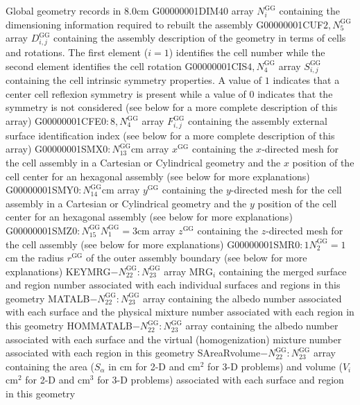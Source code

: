\begin{DescriptionEnregistrement}{Global geometry records in }{8.0cm}\label{tabl:NXTRecords}
\IntEnr
  {G00000001DIM}{$40$}
  {array $N^{\text{GG}}_{i}$ containing the dimensioning information required to rebuilt the assembly} 
\IntEnr
  {G00000001CUF}{$2,N^{\text{GG}}_{5}$}
  {array $D^{\text{GG}}_{i,j}$ containing the assembly description of the geometry in terms of cells and rotations. The first element ($i=1$) identifies the cell number while the second element identifies the cell rotation} 
\IntEnr
  {G00000001CIS}{$4,N^{\text{GG}}_{4}$}
  {array $S^{\text{GG}}_{i,j}$ containing the cell intrinsic symmetry properties. A value of $1$ indicates that a center cell reflexion symmetry is present while a value of $0$ indicates that the symmetry is not considered (see below for a more complete description of this array)} 
\IntEnr
  {G00000001CFE}{$0:8,N^{\text{GG}}_{4}$}
  {array $F^{\text{GG}}_{i,j}$ containing the assembly external surface identification index (see below for a more complete description of this array)}
\DbleEnr
  {G00000001SMX}{$0:N^{\text{GG}}_{13}$}{cm}
  {array $x^{\text{GG}}$ containing the $x$-directed mesh for the cell assembly in a Cartesian or Cylindrical geometry and the $x$ position of the cell center for an hexagonal assembly (see below for more explanations)}
\DbleEnr
  {G00000001SMY}{$0:N^{\text{GG}}_{14}$}{cm}
  {array $y^{\text{GG}}$ containing the $y$-directed mesh for the cell assembly in a Cartesian or Cylindrical geometry and the $y$ position of the cell center for an hexagonal assembly (see below for more explanations)}
\OptDbleEnr
  {G00000001SMZ}{$0:N^{\text{GG}}_{15}$}{$N^{\text{GG}}_{1}=3$}{cm}
  {array $z^{\text{GG}}$ containing the $z$-directed mesh for the cell assembly (see below for more explanations)}
\OptDbleEnr
  {G00000001SMR}{$0:1$}{$N^{\text{GG}}_{2}=1$}{cm}
  {the radius $r^{\text{GG}}$ of the outer assembly boundary (see below for more explanations)}
\IntEnr
  {KEYMRG}{$-N^{\text{GG}}_{22}:N^{\text{GG}}_{23}$}
  {array $\text{MRG}_{i}$ containing the merged surface and region number associated with each individual surfaces and regions in this geometry}
\IntEnr
  {MATALB}{$-N^{\text{GG}}_{22}:N^{\text{GG}}_{23}$}
  {array containing the albedo number associated with each surface and the physical mixture number associated with each region in this geometry}
\IntEnr
  {HOMMATALB}{$-N^{\text{GG}}_{22}:N^{\text{GG}}_{23}$}
  {array containing the albedo number associated with each surface and the virtual (homogenization) mixture number associated with each region in this geometry}
\DbleEnr
  {SAreaRvolume}{$-N^{\text{GG}}_{22}:N^{\text{GG}}_{23}$}{}
  {array containing the area ($S_{\alpha}$ in cm for 2-D and cm$^{2}$ for 3-D problems) and volume ($V_{i}$ cm$^{2}$ for 2-D and
cm$^{3}$ for 3-D problems) associated with each surface and region in this geometry}
\end{DescriptionEnregistrement}

